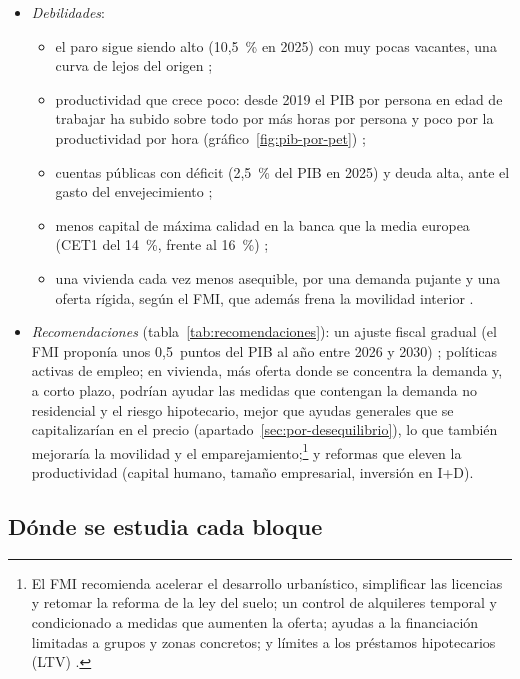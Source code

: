 \documentclass[11pt]{article}
\begin{document}
\begin{itemize}
\item \emph{Debilidades}:
  \begin{itemize}
  \item el paro sigue siendo alto (10,5~\% en 2025) con muy pocas vacantes, una curva de  lejos del origen \parencite{Eurostat2026une,Eurostat2026jvs};
  \item productividad que crece poco: desde 2019 el PIB por persona en edad de trabajar ha subido sobre todo por más horas por persona y poco por la productividad por hora (gráfico~\ref{fig:pib-por-pet}) \parencite{Eurostat2026namq10gdp};
  \item cuentas públicas con déficit (2,5~\% del PIB en 2025) y deuda alta, ante el gasto del envejecimiento \parencite{FMI2026ArticuloIV,CE2024Envejecimiento};
  \item menos capital de máxima calidad en la banca que la media europea (CET1 del 14~\%, frente al 16~\%) \parencite{BdE2026EstadSupervisoras,ABE2026RiskDashboard};
  \item una vivienda cada vez menos asequible, por una demanda pujante y una oferta rígida, según el FMI, que además frena la movilidad interior \parencite[págs.~29 y 80]{FMI2026ArticuloIV}.
  \end{itemize}
\item \emph{Recomendaciones} (tabla~\ref{tab:recomendaciones}): un ajuste fiscal gradual (el FMI proponía unos 0,5~puntos del PIB al año entre 2026 y 2030) \parencite{FMI2026ArticuloIV}; políticas activas de empleo; en vivienda, más oferta donde se concentra la demanda y, a corto plazo, podrían ayudar las medidas que contengan la demanda no residencial y el riesgo hipotecario, mejor que ayudas generales que se capitalizarían en el precio \parencite{Carozzi2024HelpToBuy,BdF2023AyudasVivienda} (apartado~\ref{sec:por-desequilibrio}), lo que también mejoraría la movilidad y el emparejamiento;\footnote{El FMI recomienda acelerar el desarrollo urbanístico, simplificar las licencias y retomar la reforma de la ley del suelo; un control de alquileres temporal y condicionado a medidas que aumenten la oferta; ayudas a la financiación limitadas a grupos y zonas concretos; y límites a los préstamos hipotecarios (LTV) \parencite[págs.~25-26, 29 y 80-81]{FMI2026ArticuloIV}.} y reformas que eleven la productividad (capital humano, tamaño empresarial, inversión en I+D).
\end{itemize}

\subsection{Dónde se estudia cada bloque}\label{anexo:temas}
\end{document}
